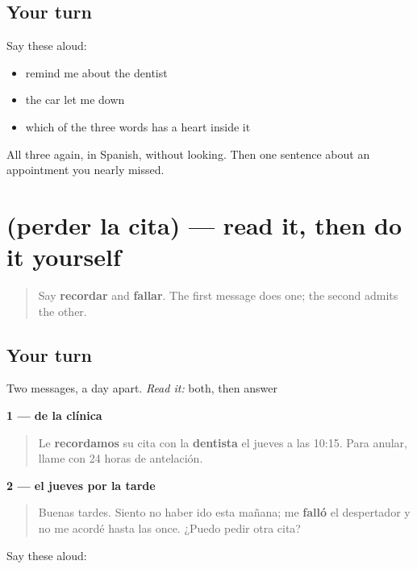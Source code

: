 \subsection*{Your turn}
Say these aloud:

\begin{itemize}
\raggedright
  \item remind me about the dentist
  \item the car let me down
  \item which of the three words has a heart inside it
\end{itemize}

\begin{tcolorbox}[breakable,colback=teal!4,colframe=teal!35!black,title={Before you move on}]
All three again, in Spanish, without looking. Then one sentence about an appointment you nearly missed.
\end{tcolorbox}
\section[Practice]{(perder la cita) — read it, then do it yourself}

\label{lesson:ES-C464-sintesis-cita}



\begin{quote}
Say \textbf{recordar} and \textbf{fallar}. The first message does one; the second admits the other.
\end{quote}

\subsection*{Your turn}
Two messages, a day apart. \emph{Read it:} both, then answer

\textbf{1 — de la clínica}

\begin{quote}
Le \textbf{recordamos} su cita con la \textbf{dentista} el jueves a las 10:15. Para anular, llame con 24 horas de antelación.
\end{quote}

\textbf{2 — el jueves por la tarde}

\begin{quote}
Buenas tardes. Siento no haber ido esta mañana; me \textbf{falló} el despertador y no me acordé hasta las once. ¿Puedo pedir otra cita?
\end{quote}

Say these aloud:

